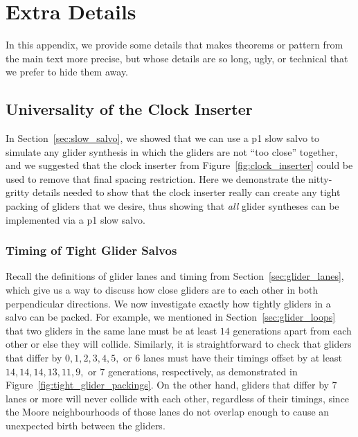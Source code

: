 
\renewcommand{\chapterfolder}{glider_synthesis/}
\chapter{Extra Details}\label{chp:appendix_extras}

In this appendix, we provide some details that makes theorems or pattern from the main text more precise, but whose details are so long, ugly, or technical that we prefer to hide them away.

\section{Universality of the Clock Inserter}\label{chp:appendix_salvo}

In Section~\ref{sec:slow_salvo}, we showed that we can use a p1 slow salvo to simulate any glider synthesis in which the gliders are not ``too close'' together, and we suggested that the clock inserter from Figure~\ref{fig:clock_inserter} could be used to remove that final spacing restriction. Here we demonstrate the nitty-gritty details needed to show that the clock inserter really can create any tight packing of gliders that we desire, thus showing that \emph{all} glider syntheses can be implemented via a p1 slow salvo.


\subsection{Timing of Tight Glider Salvos}\label{sec:salvo_timing}

Recall the definitions of glider lanes and timing from Section~\ref{sec:glider_lanes}, which give us a way to discuss how close gliders are to each other in both perpendicular directions. We now investigate exactly how tightly gliders in a salvo can be packed. For example, we mentioned in Section~\ref{sec:glider_loops} that two gliders in the same lane must be at least $14$ generations apart from each other or else they will collide. Similarly, it is straightforward to check that gliders that differ by $0, 1, 2, 3, 4, 5,$ or $6$ lanes must have their timings offset by at least $14, 14, 14, 13, 11, 9,$ or $7$ generations, respectively, as demonstrated in Figure~\ref{fig:tight_glider_packings}. On the other hand, gliders that differ by $7$ lanes or more will never collide with each other, regardless of their timings, since the Moore neighbourhoods of those lanes do not overlap enough to cause an unexpected birth between the gliders.

